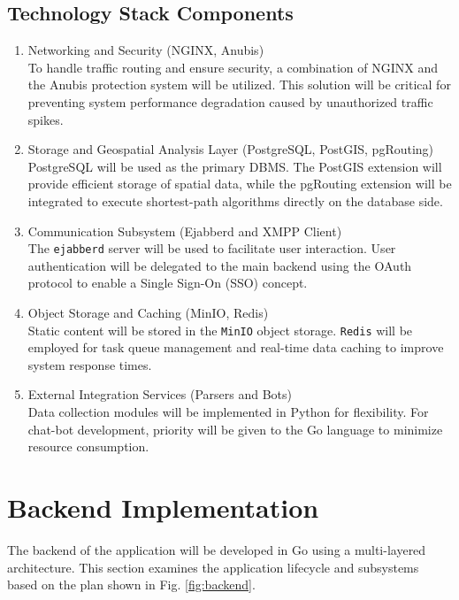 \documentclass[a4paper, 14pt]{extreport}
\begin{document}
\subsection{Technology Stack Components}
\begin{enumerate}
	\item Networking and Security (NGINX, Anubis) \\
	      To handle traffic routing and ensure security, a combination of NGINX and the Anubis protection system will be utilized. This solution will be critical for preventing system performance degradation caused by unauthorized traffic spikes.

	\item Storage and Geospatial Analysis Layer (PostgreSQL, PostGIS, pgRouting) \\
	      PostgreSQL will be used as the primary DBMS. The PostGIS extension will provide efficient storage of spatial data, while the pgRouting extension will be integrated to execute shortest-path algorithms directly on the database side.

	\item Communication Subsystem (Ejabberd and XMPP Client) \\
	      The \texttt{ejabberd} server will be used to facilitate user interaction. User authentication will be delegated to the main backend using the OAuth protocol to enable a Single Sign-On (SSO) concept.

	\item Object Storage and Caching (MinIO, Redis) \\
	      Static content will be stored in the \texttt{MinIO} object storage. \texttt{Redis} will be employed for task queue management and real-time data caching to improve system response times.

	\item External Integration Services (Parsers and Bots) \\
	      Data collection modules will be implemented in Python for flexibility. For chat-bot development, priority will be given to the Go language to minimize resource consumption.
\end{enumerate}
\section{Backend Implementation}
The backend of the application will be developed in Go using a multi-layered architecture. This section examines the application lifecycle and subsystems based on the plan shown in Fig. \ref{fig:backend}.
\end{document}
